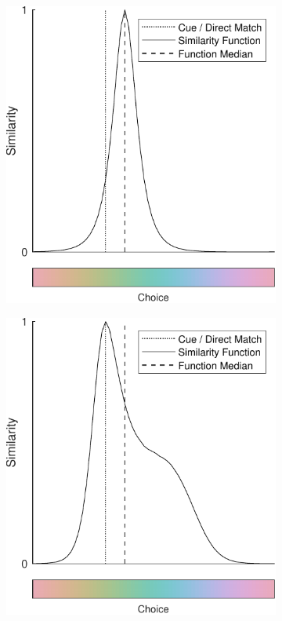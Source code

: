 \begin{figure}
    \begin{subfigure}[b]{0.49\textwidth}
         \centering
         \caption{}
         \includegraphics[width=\textwidth]{../../Figures/working/justBias_subset.pdf}
         \label{fig:JustBias_subset}
    \end{subfigure}
    \hfill
    \begin{subfigure}[b]{0.49\textwidth}
         \centering
         \caption{}
         \includegraphics[width=\textwidth]{../../Figures/working/justColSpace_subset.pdf}

\end{subfigure}
\end{figure}
